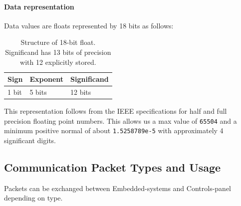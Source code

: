     \paragraph{Data representation}
    \label{par:data-repr}
    Data values are floats represented by 18 bits as follows:
    \begin{table}[H]
        \centering
        \begin{tabular}{@{}lll@{}} \toprule
            Sign & Exponent & Significand\\ \midrule
            1 bit & 5 bits & 12 bits\\ \bottomrule
        \end{tabular}
        \caption{Structure of 18-bit float. Significand has 13 bits of precision with 12 explicitly stored.}
    \end{table}
    This representation follows from the IEEE specifications for half and full precision floating point numbers. This allows us a max value of \texttt{65504} and a minimum positive normal of about \texttt{1.5258789e-5} with approximately 4 significant digits.
    \subsection{Communication Packet Types and Usage}
    Packets can be exchanged between Embedded-systems and Controls-panel depending on type.
